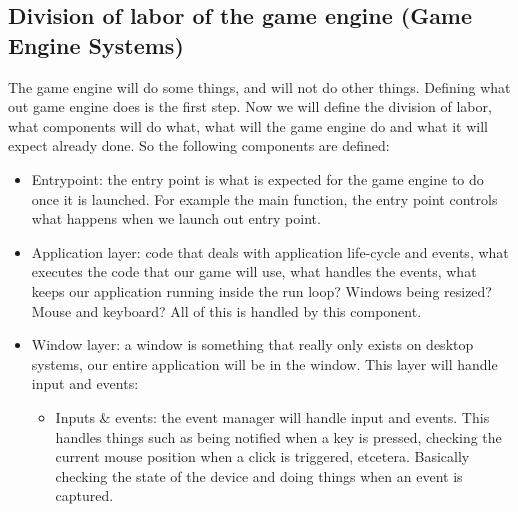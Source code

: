 \subsection{Division of labor of the game engine (Game Engine Systems)}
The game engine will do some things, and will not do other things. Defining what out game engine does is the first step. Now we will define the division of labor, what components will do what, what will the game engine do and what it will expect already done. So the following components are defined:
\begin{itemize}
    \item Entrypoint: the entry point is what is expected for the game engine to do once it is launched. For example the main function, the entry point controls what happens when we launch out entry point.
    \item Application layer: code that deals with application life-cycle and events, what executes the code that our game will use, what handles the events, what keeps our application running inside the run loop? Windows being resized? Mouse and keyboard? All of this is handled by this component. 
    \item Window layer: a window is something that really only exists on desktop systems, our entire application will be in the window. This layer will handle input and events:
        \begin{itemize}
            \item Inputs \& events: the event manager will handle input and events. This handles things such as being notified when a key is pressed, checking the current mouse position when a click is triggered, etcetera. Basically checking the state of the device and doing things when an event is captured.
        \end{itemize}
    

\end{itemize}
